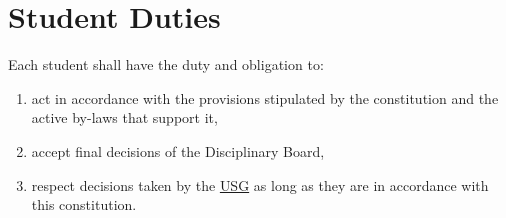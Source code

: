\section{Student Duties}
Each student shall have the duty and obligation to:
\begin{enumerate}
\item act in accordance with the provisions stipulated by the constitution and the active by-laws that support it,
\item accept final decisions of the Disciplinary Board,
\item respect decisions taken by the \hyperref[USGdef]{USG} as long as they are in accordance with this constitution.
\end{enumerate}